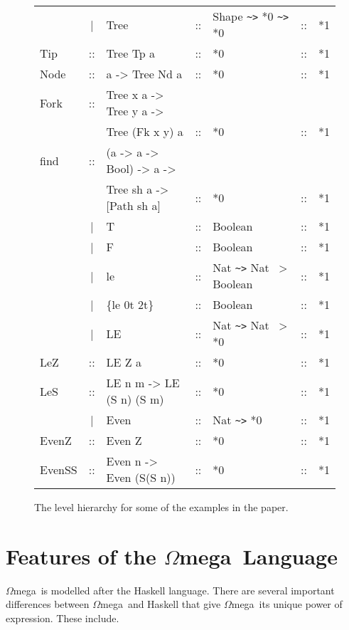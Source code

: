\documentclass[11pt,twoside,A4]{llncs}
\newcommand{\om}{\emph{$\Omega$}mega}
\begin{document}
\begin{figure}[t]
{\begin{tabular}{|lclclcl|}
      & |& Tree   &::& Shape \verb+~>+ *0  \verb+~>+ *0  &::& *1\\      
Tip &::& Tree Tp a  &::& *0 &::& *1\\  
Node &::& a -> Tree Nd a  &::& *0 &::& *1\\ 
Fork &::& Tree x a -> Tree y a -> && && \\
     &  & Tree (Fk x y) a  &::& *0 &::& *1\\ 
find &::& (a -> a -> Bool) -> a -> &&  && \\
     &  & Tree sh a -> [Path sh a] &::& *0 &::& *1 \\ \hline
      & |& T        &::& Boolean &::& *1 \\  
      & |& F        &::& Boolean &::& *1 \\ 
    &|& le  &::& Nat \verb+~>+ Nat ~> Boolean &::& *1 \\
    &|& \{le 0t 2t\}   &::& Boolean &::& *1 \\ \hline
    &|&  LE &::& Nat \verb+~>+ Nat ~> *0 &::& *1 \\
LeZ &::& LE Z a            &::&  *0     &::& *1 \\
LeS &::& LE n m -> LE (S n) (S m)  &::&  *0     &::& *1 \\ \hline

      & |&  Even  &::&  Nat \verb+~>+ *0 &::& *1 \\
EvenZ &::& Even Z &::& *0 &::& *1 \\
EvenSS &::& Even n -> Even (S(S n)) &::& *0 &::& *1 \\
\hline
\end{tabular}
}
\caption{The level hierarchy for some of the examples in the paper.} \label{hierarchy}
\end{figure}


\section{Features of the \om\ Language} \label{features}
\om\ is modelled after the Haskell language. There are several
important differences between \om\ and Haskell that
give \om\ its unique power of expression. These include.
\end{document}
